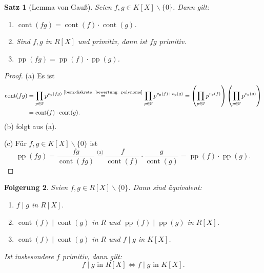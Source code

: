 \documentclass[a4paper, twoside, 11pt, ngerman]{report}
\renewcommand{\setminus}{\smallsetminus}
\DeclareMathOperator{\cont}{cont}
\DeclareMathOperator{\pp}{pp}
\theoremstyle{definistyle}
\newtheorem{satz}{Satz}[section]
\newtheorem{folgerung}[satz]{Folgerung}
\theoremstyle{remark}
\begin{document}
\begin{satz}[Lemma von Gauß]\label{satz:gauss_lemma}
Seien $f, g \in K[X] \setminus \{0\}$. Dann gilt:
\begin{enumerate}[label=(\alph*)]
    \item $\cont(fg) = \cont(f) \cdot \cont(g)$.
    \item Sind $f, g$ in $R[X]$ und primitiv, dann ist $fg$ primitiv.
    \item $\pp(fg) = \pp(f) \cdot \pp(g)$.
\end{enumerate}
\end{satz}

\begin{proof}
(a) Es ist
    \begin{align*}
    \cont(fg) &= \prod_{p \in \mathbb{P}} p^{v_p(fg)} \stackrel{\text{\ref{bem:diskrete_bewertung_polynome}}}{=} \prod_{p \in \mathbb{P}} p^{v_p(f) + v_p(g)} = \left( \prod_{p \in \mathbb{P}} p^{v_p(f)} \right) \left( \prod_{p \in \mathbb{P}} p^{v_p(g)} \right) \\
    &= \cont(f) \cdot \cont(g).
    \end{align*}
(b) folgt aus (a).

(c) Für $f, g \in K[X] \setminus \{0\}$ ist
    \[
    \pp(fg) = \frac{fg}{\cont(fg)} \stackrel{\text{(a)}}{=} \frac{f}{\cont(f)} \cdot \frac{g}{\cont(g)} = \pp(f) \cdot \pp(g).
    \]
\end{proof}

\begin{folgerung}\label{folg:teilbarkeit_im_polring}
Seien $f, g \in R[X] \setminus \{0\}$. Dann sind äquivalent:
\begin{enumerate}[label=(\roman*)]
    \item $f\mid g$ in $R[X]$.
    \item $\cont(f) \mid \cont(g)$ in $R$ und $\pp(f) \mid \pp(g)$ in $R[X]$.
    \item $\cont(f) \mid \cont(g)$ in $R$ und $f\mid g$ in $K[X]$.
\end{enumerate}
Ist insbesondere $f$ primitiv, dann gilt:
\[
f\mid g \text{ in } R[X] \iff f\mid g \text{ in } K[X].
\]
\end{folgerung}
\end{document}
